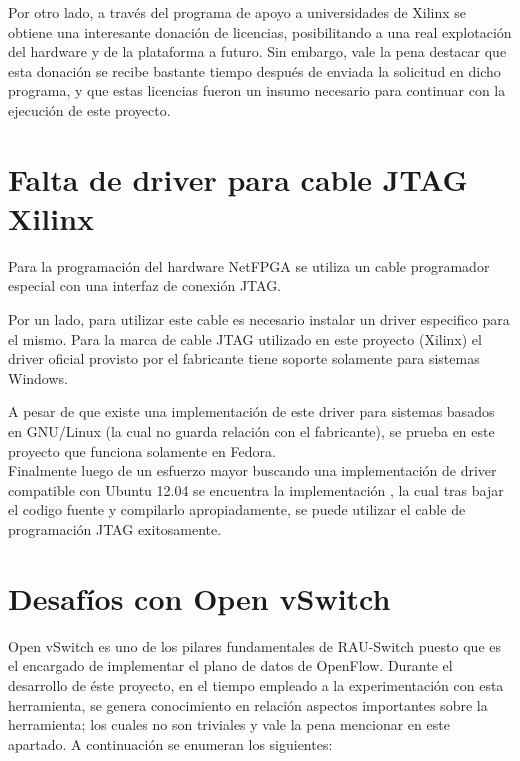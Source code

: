 Por otro lado, a través del programa de apoyo a universidades de Xilinx se obtiene una interesante donación de licencias, posibilitando a una real explotación del hardware y de la plataforma a futuro. Sin embargo, vale la pena destacar que esta donaci\'on se recibe bastante tiempo después de enviada la solicitud en dicho programa, y que estas licencias fueron un insumo necesario para continuar con la ejecuci\'on de este proyecto.  

\section{Falta de driver para cable JTAG Xilinx}
Para la programación del hardware NetFPGA se utiliza un cable programador especial con una interfaz de conexi\'on JTAG. 

Por un lado, para utilizar este cable es necesario instalar un driver especifico para el mismo. Para la marca de cable JTAG utilizado en este proyecto (Xilinx) el driver oficial provisto por el fabricante tiene soporte solamente para sistemas Windows.

A pesar de que existe una implementaci\'on de este driver para sistemas basados en GNU/Linux (la cual no guarda relación con el fabricante), se prueba en este proyecto que funciona solamente en Fedora.\\

Finalmente luego de un esfuerzo mayor buscando una implementaci\'on de driver compatible con Ubuntu 12.04 se encuentra la implementaci\'on \cite{JtagD}, la cual tras bajar el codigo fuente y compilarlo apropiadamente, se puede utilizar el cable de programaci\'on JTAG exitosamente.

\section{Desaf\'ios con Open vSwitch}
\label{apendiceB5}

Open vSwitch es uno de los pilares fundamentales de RAU-Switch puesto que es el encargado de implementar el plano de datos de OpenFlow. Durante el desarrollo de \'este proyecto, en el tiempo empleado a la experimentaci\'on con esta herramienta, se genera conocimiento en relaci\'on aspectos importantes sobre la herramienta; los cuales no son triviales y vale la pena mencionar en este apartado. A continuaci\'on se enumeran los siguientes:\\ 

